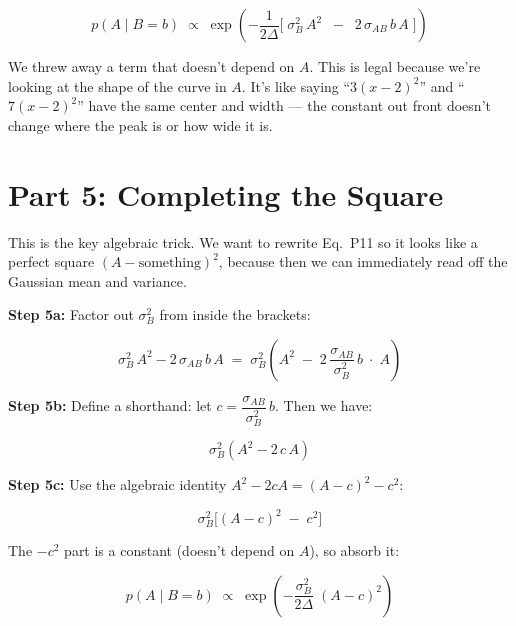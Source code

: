 \documentclass[11pt, a4paper]{article}
\newcommand{\gut}[1]{\begin{tcolorbox}[colback=lightyellow, colframe=orange!50, title=Gut feeling]#1\end{tcolorbox}}
\begin{document}
\begin{equation}
p(A \mid B = b) \;\propto\; \exp\!\left( -\frac{1}{2\Delta} \Big[ \;\sigma_B^2\, A^2 \;\;-\;\; 2\,\sigma_{AB}\, b\, A \;\Big] \right)
\tag{P11}
\end{equation}

\gut{
We threw away a term that doesn't depend on $A$. This is legal because we're looking at the shape of the curve in $A$. It's like saying ``$3(x-2)^2$'' and ``$7(x-2)^2$'' have the same center and width --- the constant out front doesn't change where the peak is or how wide it is.
}


\section*{\color{secblue}Part 5: Completing the Square}

This is the key algebraic trick. We want to rewrite Eq.~P11 so it looks like a perfect square $(A - \text{something})^2$, because then we can immediately read off the Gaussian mean and variance.

\bigskip
\textbf{Step 5a:} Factor out $\sigma_B^2$ from inside the brackets:

\begin{equation}
\sigma_B^2\, A^2 - 2\,\sigma_{AB}\, b\, A
\;=\;
\sigma_B^2 \left( A^2 \;-\; 2\,\frac{\sigma_{AB}}{\sigma_B^2}\, b \;\cdot\; A \right)
\tag{P12}
\end{equation}

\textbf{Step 5b:} Define a shorthand: let $c = \dfrac{\sigma_{AB}}{\sigma_B^2}\, b$. Then we have:

\begin{equation}
\sigma_B^2 \left( A^2 - 2\,c\, A \right)
\tag{P13}
\end{equation}

\textbf{Step 5c:} Use the algebraic identity $A^2 - 2cA = (A - c)^2 - c^2$:

\begin{equation}
\sigma_B^2 \Big[ (A - c)^2 \;-\; c^2 \Big]
\tag{P14}
\end{equation}

The $-c^2$ part is a constant (doesn't depend on $A$), so absorb it:

\begin{equation}
p(A \mid B = b) \;\propto\; \exp\!\left( -\frac{\sigma_B^2}{2\Delta} \;(A - c)^2 \right)
\tag{P15}
\end{equation}
\end{document}
